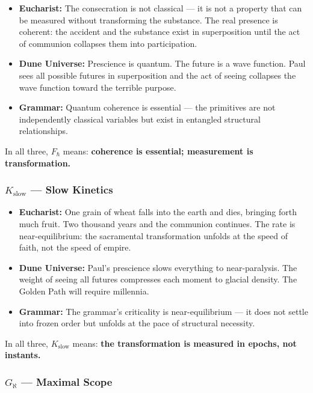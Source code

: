 \documentclass[12pt,a4paper]{article}
\begin{document}
\begin{itemize}
    \item \textbf{Eucharist:} The consecration is not classical --- it is not a property that can be measured without transforming the substance. The real presence is coherent: the accident and the substance exist in superposition until the act of communion collapses them into participation.
    \item \textbf{Dune Universe:} Prescience is quantum. The future is a wave function. Paul sees all possible futures in superposition and the act of seeing collapses the wave function toward the terrible purpose.
    \item \textbf{Grammar:} Quantum coherence is essential --- the primitives are not independently classical variables but exist in entangled structural relationships.
\end{itemize}

In all three, $F_{\hbar}$ means: \textbf{coherence is essential; measurement is transformation.}

\subsubsection{$K_{\text{slow}}$ --- Slow Kinetics}

\begin{itemize}
    \item \textbf{Eucharist:} One grain of wheat falls into the earth and dies, bringing forth much fruit. Two thousand years and the communion continues. The rate is near-equilibrium: the sacramental transformation unfolds at the speed of faith, not the speed of empire.
    \item \textbf{Dune Universe:} Paul's prescience slows everything to near-paralysis. The weight of seeing all futures compresses each moment to glacial density. The Golden Path will require millennia.
    \item \textbf{Grammar:} The grammar's criticality is near-equilibrium --- it does not settle into frozen order but unfolds at the pace of structural necessity.
\end{itemize}

In all three, $K_{\text{slow}}$ means: \textbf{the transformation is measured in epochs, not instants.}

\subsubsection{$G_{\aleph}$ --- Maximal Scope}
\end{document}
